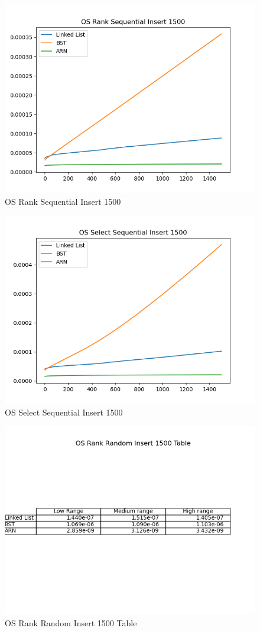 \documentclass[11pt]{article}
\begin{document}
 \begin{figure}[H]
  \centering
  \includegraphics[width=0.8\linewidth]{Images/1500/OS Rank Sequential Insert 1500.png}
  \caption{OS Rank Sequential Insert 1500 }
  \label{fig:OS Rank Sequential Insert 1500}
\end{figure}
 \begin{figure}[H]
  \centering
  \includegraphics[width=0.8\linewidth]{Images/1500/OS Select Sequential Insert 1500.png}
  \caption{OS Select Sequential Insert 1500 }
  \label{fig:OS Select Sequential Insert 1500}
\end{figure}
 \begin{figure}[H]
  \centering
  \includegraphics[width=0.8\linewidth]{Images/1500/OS Rank Random Insert 1500 Table.png}
  \caption{OS Rank Random Insert 1500 Table }
  \label{fig:OS Rank Random Insert 1500 Table}
\end{figure}
\end{document}
